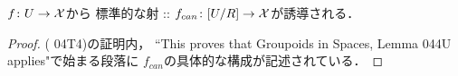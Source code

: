 \documentclass[a4paper, dvipdfmx]{jsarticle}
\begin{document}
    \begin{Lemma}[\cite{SP} 04T4 (5)]
        $f \colon U \to \mathcal{X}$から
        標準的な射 :: $f_{can} \colon [U/R] \to \mathcal{X}$が誘導される．
    \end{Lemma}
    \begin{proof}
        (\cite{SP} 04T4)の証明内，
        ``This proves that Groupoids in Spaces, Lemma 044U applies"で始まる段落に
        $f_{can}$の具体的な構成が記述されている．
    \end{proof}



\end{document}
